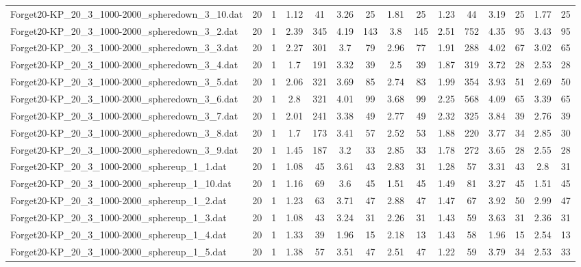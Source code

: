 \begin{table}[!ht]
{\begin{tabular}{lcccccccccccccc}
Forget20-KP\_20\_3\_1000-2000\_spheredown\_3\_10.dat & 20 & 1 & 1.12 & 41 & 3.26 & 25 & 1.81 & 25 & 1.23 & 44 & 3.19 & 25 & 1.77 & 25 \\
Forget20-KP\_20\_3\_1000-2000\_spheredown\_3\_2.dat & 20 & 1 & 2.39 & 345 & 4.19 & 143 & 3.8 & 145 & 2.51 & 752 & 4.35 & 95 & 3.43 & 95 \\
Forget20-KP\_20\_3\_1000-2000\_spheredown\_3\_3.dat & 20 & 1 & 2.27 & 301 & 3.7 & 79 & 2.96 & 77 & 1.91 & 288 & 4.02 & 67 & 3.02 & 65 \\
Forget20-KP\_20\_3\_1000-2000\_spheredown\_3\_4.dat & 20 & 1 & 1.7 & 191 & 3.32 & 39 & 2.5 & 39 & 1.87 & 319 & 3.72 & 28 & 2.53 & 28 \\
Forget20-KP\_20\_3\_1000-2000\_spheredown\_3\_5.dat & 20 & 1 & 2.06 & 321 & 3.69 & 85 & 2.74 & 83 & 1.99 & 354 & 3.93 & 51 & 2.69 & 50 \\
Forget20-KP\_20\_3\_1000-2000\_spheredown\_3\_6.dat & 20 & 1 & 2.8 & 321 & 4.01 & 99 & 3.68 & 99 & 2.25 & 568 & 4.09 & 65 & 3.39 & 65 \\
Forget20-KP\_20\_3\_1000-2000\_spheredown\_3\_7.dat & 20 & 1 & 2.01 & 241 & 3.38 & 49 & 2.77 & 49 & 2.32 & 325 & 3.84 & 39 & 2.76 & 39 \\
Forget20-KP\_20\_3\_1000-2000\_spheredown\_3\_8.dat & 20 & 1 & 1.7 & 173 & 3.41 & 57 & 2.52 & 53 & 1.88 & 220 & 3.77 & 34 & 2.85 & 30 \\
Forget20-KP\_20\_3\_1000-2000\_spheredown\_3\_9.dat & 20 & 1 & 1.45 & 187 & 3.2 & 33 & 2.85 & 33 & 1.78 & 272 & 3.65 & 28 & 2.55 & 28 \\
Forget20-KP\_20\_3\_1000-2000\_sphereup\_1\_1.dat & 20 & 1 & 1.08 & 45 & 3.61 & 43 & 2.83 & 31 & 1.28 & 57 & 3.31 & 43 & 2.8 & 31 \\
Forget20-KP\_20\_3\_1000-2000\_sphereup\_1\_10.dat & 20 & 1 & 1.16 & 69 & 3.6 & 45 & 1.51 & 45 & 1.49 & 81 & 3.27 & 45 & 1.51 & 45 \\
Forget20-KP\_20\_3\_1000-2000\_sphereup\_1\_2.dat & 20 & 1 & 1.23 & 63 & 3.71 & 47 & 2.88 & 47 & 1.47 & 67 & 3.92 & 50 & 2.99 & 47 \\
Forget20-KP\_20\_3\_1000-2000\_sphereup\_1\_3.dat & 20 & 1 & 1.08 & 43 & 3.24 & 31 & 2.26 & 31 & 1.43 & 59 & 3.63 & 31 & 2.36 & 31 \\
Forget20-KP\_20\_3\_1000-2000\_sphereup\_1\_4.dat & 20 & 1 & 1.33 & 39 & 1.96 & 15 & 2.18 & 13 & 1.43 & 58 & 1.96 & 15 & 2.54 & 13 \\
Forget20-KP\_20\_3\_1000-2000\_sphereup\_1\_5.dat & 20 & 1 & 1.38 & 57 & 3.51 & 47 & 2.51 & 47 & 1.22 & 59 & 3.79 & 34 & 2.53 & 33 \\

\end{tabular}}
\end{table}
